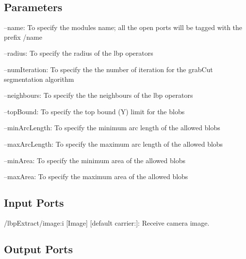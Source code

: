  \hypertarget{group__seg2cloud_parameters_sec}{}\subsection{Parameters}\label{group__seg2cloud_parameters_sec}

\begin{DoxyItemize}
\item --name\+: To specify the module\textquotesingle{}s name; all the open ports will be tagged with the prefix /name
\item --radius\+: To specify the radius of the lbp operators
\item --num\+Iteration\+: To specify the the number of iteration for the grab\+Cut segmentation algorithm
\item --neighbours\+: To specify the the neighbours of the lbp operators
\item --top\+Bound\+: To specify the top bound (Y) limit for the blobs
\item --min\+Arc\+Length\+: To specify the minimum arc length of the allowed blobs
\item --max\+Arc\+Length\+: To specify the maximum arc length of the allowed blobs
\item --min\+Area\+: To specify the minimum area of the allowed blobs
\item --max\+Area\+: To specify the maximum area of the allowed blobs 
\end{DoxyItemize}\hypertarget{group__seg2cloud_inputports_sec}{}\subsection{Input Ports}\label{group__seg2cloud_inputports_sec}

\begin{DoxyItemize}
\item /lbp\+Extract/image\+:i \mbox{[}Image\mbox{]} \mbox{[}default carrier\+:\mbox{]}\+: Receive camera image.
\end{DoxyItemize}\hypertarget{group__seg2cloud_outputports_sec}{}\subsection{Output Ports}\label{group__seg2cloud_outputports_sec}

